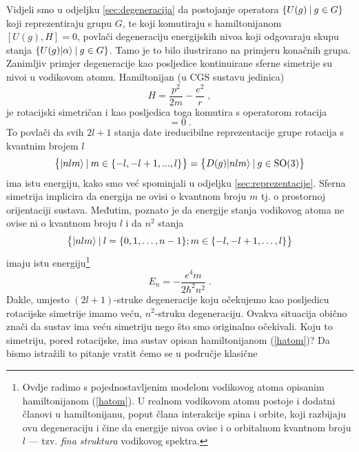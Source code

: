 Vidjeli smo u odjeljku \ref{sec:degeneracija} da postojanje operatora
$\{U(g) \: | \: g\in G \}$ koji reprezentiraju grupu $G$, te koji
komutiraju s hamiltonijanom $[U(g), H] = 0$, povlači degeneraciju
energijskih nivoa koji odgovaraju skupu stanja $\{U(g)| \alpha \rangle \: | \: g\in
G \}$. Tamo je to bilo ilustrirano na primjeru konačnih grupa. Zanimljiv
primjer degeneracije kao posljedice kontinuirane sferne simetrije su
nivoi u vodikovom atomu. Hamiltonijan (u CGS sustavu jedinica)
\begin{equation}
    H = \frac{p^2}{2m} - \frac{e^2}{r} \;,
\label{hatom}
\end{equation}
je rotacijski simetričan i kao posljedica toga komutira s operatorom
rotacija
\begin{equation}
     [H, D(\vec{n},\phi)] = 0 \;.
\end{equation}
To povlači da svih $2l+1$ stanja date ireducibilne reprezentacije
grupe rotacija s kvantnim brojem $l$
\begin{equation}
   \big\{| nlm \rangle \: | \: m\in\{-l, -l+1, ..., l \}\big\} = 
   \big\{ D(g)| nlm \rangle \: | \: g \in \mathrm{SO}(3) \big\}
\end{equation}
ima istu energiju, kako smo već spominjali u odjeljku \ref{sec:reprezentacije}.
Sferna simetrija implicira da energija ne ovisi o kvantnom broju $m$
tj. o prostornoj orijentaciji sustava.
Međutim, poznato je da energije stanja vodikovog atoma ne
ovise ni o kvantnom broju $l$ i da $n^2$ stanja
\begin{equation}
\big\{| nlm \rangle \: | \: l=\{0, 1, \ldots, n-1\}; m\in\{-l, -l+1, \ldots, l \}\big\} 
\end{equation}
imaju istu energiju\footnote{Ovdje radimo s pojednostavljenim modelom vodikovog atoma
opisanim hamiltonijanom (\protect\ref{hatom}). U realnom vodikovom atomu
postoje i dodatni članovi u hamiltonijanu, poput člana interakcije spina
i orbite, koji razbijaju ovu degeneraciju i čine da energije nivoa ovise
i o orbitalnom kvantnom broju $l$ --- tzv. \emph{fina struktura} vodikovog
spektra.}
\begin{equation}
    E_n = - \frac{e^4 m}{2 \hbar^2 n^2}  \;.
\end{equation}
Dakle, umjesto $(2l+1)$-struke degeneracije koju očekujemo kao posljedicu
rotacijske simetrije imamo veću, $n^2$-struku degeneraciju. Ovakva
situacija obično znači da sustav ima veću simetriju nego što smo
originalno očekivali. Koju to simetriju, pored rotacijske, ima
sustav opisan hamiltonijanom (\ref{hatom})?
Da bismo istražili to pitanje vratit ćemo se u područje klasične
